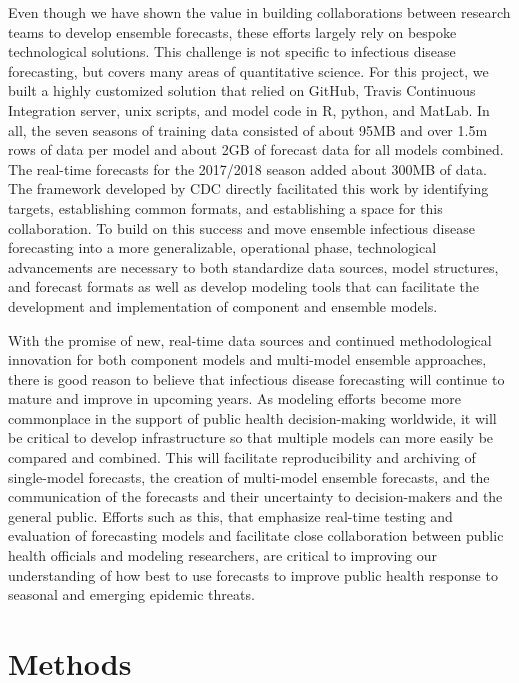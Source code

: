 \documentclass{article}\usepackage[]{graphicx}\usepackage[]{color}
\begin{document}
Even though we have shown the value in building collaborations between research teams to develop ensemble forecasts, these efforts largely rely on bespoke technological solutions.
This challenge is not specific to infectious disease forecasting, but covers many areas of quantitative science.
For this project, we built a highly customized solution that relied on GitHub, Travis Continuous Integration server, unix scripts, and model code in R, python, and MatLab. 
In all, the seven seasons of training data consisted of about 95MB and over 1.5m rows of data per model and about 2GB of forecast data for all models combined.
The real-time forecasts for the 2017/2018 season added about 300MB of data.
The framework developed by CDC directly facilitated this work by identifying targets, establishing common formats, and establishing a space for this collaboration. To build on this success
and move ensemble infectious disease forecasting into a more generalizable, operational phase, technological advancements are necessary to both standardize data sources, model structures, and forecast formats as well as develop modeling tools that can facilitate the development and implementation of component and ensemble models.

With the promise of new, real-time data sources and continued methodological innovation for both component models and multi-model ensemble approaches, there is good reason to believe that infectious disease forecasting will continue to mature and improve in upcoming years.
As modeling efforts become more commonplace in the support of public health decision-making worldwide, it will be critical to develop infrastructure so that multiple models can more easily be compared and combined.
This will facilitate reproducibility and archiving of single-model forecasts, the creation of multi-model ensemble forecasts, and the communication of the forecasts and their uncertainty to decision-makers and the general public.
Efforts such as this, that emphasize real-time testing and evaluation of forecasting models and facilitate close collaboration between public health officials and modeling researchers, are critical to improving our understanding of how best to use forecasts to improve public health response to seasonal and emerging epidemic threats.


\section{Methods}
\end{document}
